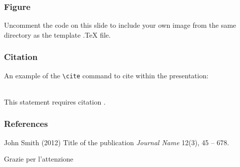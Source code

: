 \documentclass{beamer}
\begin{document}

\begin{frame}
\frametitle{Figure}
Uncomment the code on this slide to include your own image from the same directory as the template .TeX file.
\end{frame}


\begin{frame}[fragile] %
\frametitle{Citation}
An example of the \verb|\cite| command to cite within the presentation:\\~

This statement requires citation \cite{p1}.
\end{frame}


\begin{frame}
\frametitle{References}
\footnotesize{
\begin{thebibliography}{99} %
 John Smith (2012)
\newblock Title of the publication
\newblock \emph{Journal Name} 12(3), 45 -- 678.
\end{thebibliography}
}
\end{frame}


\begin{frame}
\Huge{\centerline{Grazie per l'attenzione}}
\end{frame}

\end{document}
